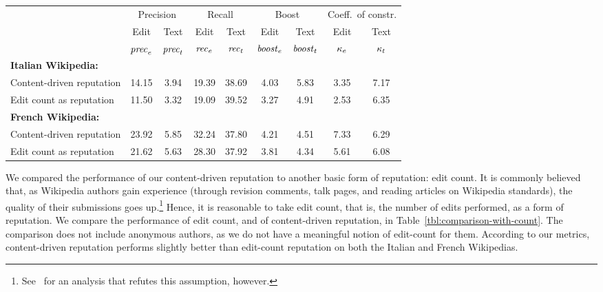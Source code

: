 \begin{sidewaystable}
\begin{center}
\begin{tabular}{|l||c|c||c|c||c|c||c|c|} \hline
 & \multicolumn{2}{|c||}{Precision}
 & \multicolumn{2}{|c||}{Recall}
 & \multicolumn{2}{|c||}{Boost}
 & \multicolumn{2}{|c|}{Coeff.\ of constr.} \\
 & Edit & Text & Edit & Text  & Edit & Text & Edit & Text \\
 & ${\text{\textit{prec}}}_e$ & ${\text{\textit{prec}}}_t$ & ${\text{\textit{rec}}}_e$ & ${\text{\textit{rec}}}_t$ & ${\text{\textit{boost}}}_e$ & ${\text{\textit{boost}}}_t$
 & $\kappa_e$ & $\kappa_t$ \\[0.5ex] \hline
\textbf{Italian Wikipedia:} & & & & & & & & \\
\qquad Content-driven reputation & 14.15 &  3.94 & 19.39 & 38.69 & 4.03 & 5.83 & 3.35 & 7.17 \\
\qquad Edit count as reputation  & 11.50 &  3.32 & 19.09 & 39.52 & 3.27 & 4.91 & 2.53 & 6.35 \\ \hline
\textbf{French Wikipedia:} & & & & & & & & \\
\qquad Content-driven reputation & 23.92 &  5.85 & 32.24 & 37.80 & 4.21 & 4.51 & 7.33 & 6.29 \\
\qquad Edit count as reputation &  21.62 &  5.63 & 28.30 & 37.92 & 3.81 & 4.34 & 5.61 & 6.08 \\ \hline
\end{tabular}
\end{center}
\caption[Performance of WikiTrust compared to edit count]
  {Summary of the performance of content-driven reputation over
  the Italian and French Wikipedias. All data are expressed as
  percentages. Anonymous authors are not included in the comparison.
  Precision is the probability that the text or edit longevity is low,
  given that the reputation is low.
  Recall is the probability that the reputation is low, given
  that the text or edit longevity is low.}
\label{tbl:comparison-with-count}
\end{sidewaystable}

We compared the performance of our content-driven reputation to
another basic form of reputation: edit count.
It is commonly believed that, as Wikipedia authors gain experience
(through revision comments, talk pages, and reading articles on
Wikipedia standards), the quality of their submissions goes
up.\footnote{See~\cite{Halfaker2011} for an analysis that refutes
this assumption, however.}
Hence, it is reasonable to take edit count, that is, the number of
edits performed, as a form of reputation.
We compare the performance of edit count, and of content-driven
reputation, in Table~\ref{tbl:comparison-with-count}.
The comparison does not include anonymous authors, as we do not have a
meaningful notion of edit-count for them.
According to our metrics, content-driven reputation
performs slightly better than edit-count reputation on both the Italian
and French Wikipedias.

